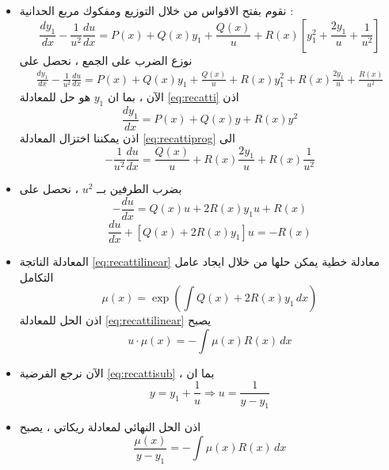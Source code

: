 		\begin{frame}
			\begin{itemize}
				\item
				نقوم بفتح الاقواس من خلال التوزيع ومفكوك مربع الحدانية :
				\[
				\frac{dy_1}{dx} - \frac{1}{u^2} \frac{du}{dx} = P(x) + Q(x) y_1 + \frac{Q(x)}{u} + R(x) \left[y_1^2 + \frac{2y_1}{u} + \frac{1}{u^2}\right]
				\]
				نوزع الضرب على الجمع ، نحصل على 
				\begin{equation}
					\label{eq:recattiprog}
					\begin{split}
						\frac{dy_1}{dx} - \frac{1}{u^2} \frac{du}{dx} = P(x) + Q(x) y_1 + \frac{Q(x)}{u}+ R(x) y_1^2 + R(x)\frac{2y_1}{u} + \frac{R(x)}{u^2}
					\end{split}
				\end{equation}
				الآن ، بما ان $y_1 $ هو حل للمعادلة \eqref{eq:recatti} اذن
				\[
				\frac{dy_1}{dx} = P(x) + Q(x) y + R(x) y^2
				\]
				اذن يمكننا اختزال المعادلة \eqref{eq:recattiprog} الى
				\[
				- \frac{1}{u^2} \frac{du}{dx} =  \frac{Q(x)}{u}  + R(x)\frac{2y_1}{u} + R(x)\frac{1}{u^2}
				\]
			\end{itemize}
		\end{frame}
		
		\begin{frame}
			\begin{itemize}
				\item 
				بضرب الطرفين بــ $u^2 $ ، نحصل على 
				\[
				- \frac{du}{dx} = Q(x) u + 2R(x)y_1 u + R(x)
				\]
				\begin{equation}
					\label{eq:recattilinear}
					\frac{du}{dx} + [Q(x) + 2R(x)y_1] u = -R(x)
				\end{equation}
				
				\item المعادلة الناتجة \eqref{eq:recattilinear} معادلة خطية يمكن حلها من خلال ايجاد عامل التكامل 
				\[
				\mu(x) = \exp \left(\int Q(x) + 2R(x) y_1 \, dx\right)
				\]
				اذن الحل للمعادلة \eqref{eq:recattilinear} يصبح
				\[
				u\cdot \mu(x) = - \int \mu(x) R(x) \,dx
				\]
			\end{itemize}
		\end{frame}

		\begin{frame}
			\begin{itemize}
				
				\item الآن نرجع الفرضية \eqref{eq:recattisub} ، بما ان
				\[
				y = y_1 + \frac{1}{u} \Rightarrow u = \frac{1}{y-y_1}
				\]
				\item اذن الحل النهائي لمعادلة ريكاتي ، يصبح
				\[
				\frac{\mu(x)}{y-y_1} = - \int \mu(x) R(x) \,dx
				\]
			\end{itemize}
		\end{frame}
		

